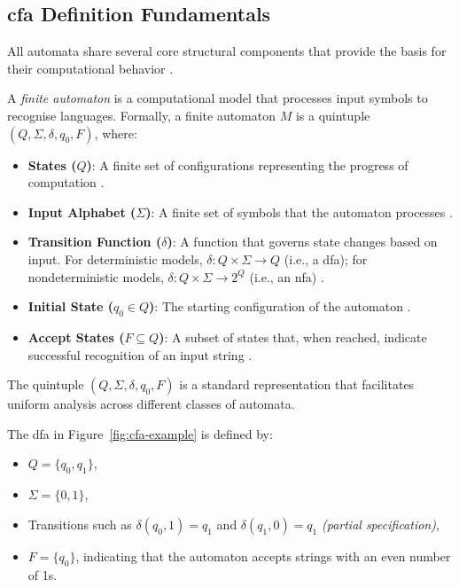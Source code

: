 \subsection{\acrshort{cfa} Definition Fundamentals}
\label{subsec:automata-definition-fundamentals}
All automata share several core structural components that provide the basis for their computational behavior \cite{hopcroft2006introduction, chomsky1956three}.

\begin{definition}
\label{def:finite-automaton}
A \textit{finite automaton} is a computational model that processes input symbols to recognise languages. Formally, a finite automaton $M$ is a quintuple $(Q, \Sigma, \delta, q_0, F)$, where:
\begin{itemize}
    \item \textbf{States ($Q$)}: A finite set of configurations representing the progress of computation \cite{hopcroft2006introduction}.
    \item \textbf{Input Alphabet ($\Sigma$)}: A finite set of symbols that the automaton processes \cite{hopcroft2006introduction}.
    \item \textbf{Transition Function ($\delta$)}: A function that governs state changes based on input. For deterministic models, $\delta: Q \times \Sigma \to Q$ (i.e., a \gls{dfa}); for nondeterministic models, $\delta: Q \times \Sigma \to 2^Q$ (i.e., an \gls{nfa}) \cite{chomsky1956three, hopcroft2006introduction}.
    \item \textbf{Initial State ($q_0 \in Q$)}: The starting configuration of the automaton \cite{hopcroft2006introduction}.
    \item \textbf{Accept States ($F \subseteq Q$)}: A subset of states that, when reached, indicate successful recognition of an input string \cite{hopcroft2006introduction}.
\end{itemize}
\end{definition}

\begin{remark}
The quintuple $(Q, \Sigma, \delta, q_0, F)$ is a standard representation that facilitates uniform analysis across different classes of automata.
\end{remark}

\begin{example}
The \gls{dfa} in Figure~\ref{fig:cfa-example} is defined by:
\begin{itemize}
    \item $Q = \{q_0, q_1\}$,
    \item $\Sigma = \{0, 1\}$,
    \item Transitions such as $\delta(q_0, 1) = q_1$ and $\delta(q_1, 0) = q_1$ \textit{(partial specification)},
    \item $F = \{q_0\}$, indicating that the automaton accepts strings with an even number of 1s.
\end{itemize}
\end{example}

